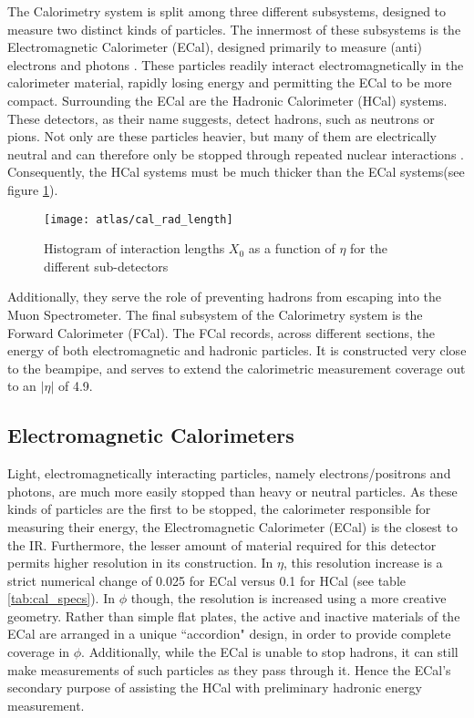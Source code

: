     The Calorimetry system is split among three different subsystems, designed to measure two distinct kinds of particles.
    The innermost of these subsystems is the Electromagnetic Calorimeter (ECal), designed primarily to measure (anti) electrons and photons \cite{calorimetry_lecture}.
    These particles readily interact electromagnetically in the calorimeter material, rapidly losing energy and permitting the ECal to be more compact.
    Surrounding the ECal are the Hadronic Calorimeter (HCal) systems.
    These detectors, as their name suggests, detect hadrons, such as neutrons or pions.
    Not only are these particles heavier, but many of them are electrically neutral and can therefore only be stopped through repeated nuclear interactions \cite{energy_measurement}.
    Consequently, the HCal systems must be much thicker than the ECal systems(see figure \ref{fig:cal_rad_length}).
    \begin{figure}
        \texttt{[image: atlas/cal\_rad\_length]}
        \caption{Histogram of interaction lengths $X_0$ as a function of $\eta$ for the different sub-detectors \cite{atlas_tdr}}
        \label{fig:cal_rad_length}
    \end{figure}
    Additionally, they serve the role of preventing hadrons from escaping into the Muon Spectrometer.
    The final subsystem of the Calorimetry system is the Forward Calorimeter (FCal).
    The FCal records, across different sections, the energy of both electromagnetic and hadronic particles.
    It is constructed very close to the beampipe, and serves to extend the calorimetric measurement coverage out to an $|\eta|$ of 4.9.

    \subsection{Electromagnetic Calorimeters}
        Light, electromagnetically interacting particles, namely electrons/positrons and photons, are much more easily stopped than heavy or neutral particles.
        As these kinds of particles are the first to be stopped, the calorimeter responsible for measuring their energy, the Electromagnetic Calorimeter (ECal) is the closest to the IR.
        Furthermore, the lesser amount of material required for this detector permits higher resolution in its construction.
        In $\eta$, this resolution increase is a strict numerical change of 0.025 for ECal versus 0.1 for HCal (see table \ref{tab:cal_specs}).
        In $\phi$ though, the resolution is increased using a more creative geometry.
        Rather than simple flat plates, the active and inactive materials of the ECal are arranged in a unique ``accordion" design, in order to provide complete coverage in $\phi$.
        Additionally, while the ECal is unable to stop hadrons, it can still make measurements of such particles as they pass through it.
        Hence the ECal's secondary purpose of assisting the HCal with preliminary hadronic energy measurement.


